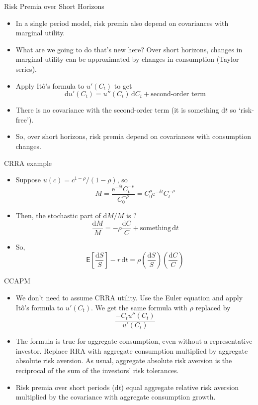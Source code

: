 \documentclass[10pt]{beamer}
\newcommand{\bi}{\begin{itemize}}
\newcommand{\ei}{\end{itemize}}
\newcommand{\im}{\item}
\newcommand{\D}{\mathrm{d}}
\newcommand{\E}{\mathrm{e}}
\newcommand{\mye}{\ensuremath{\mathsf{E}}}
\begin{document}
\begin{frame}{Risk Premia over Short Horizons}
  \bi
    \im In a single period model, risk premia also depend on covariances with marginal utility.
    
    \im What are we going to do that's new here?  Over short horizons, changes in marginal utility can be approximated by changes in consumption (Taylor series).
    
    \im Apply It\^o's formula to $u'(C_t)$ to get
    $$\D u'(C_t) = u''(C_t)\,\D C_t + \text{second-order term}$$
    \im There is no covariance with the second-order term (it is something $\D t$ so `risk-free').  
    
    \im So, over short horizons, risk premia depend on covariances with consumption changes.
    \ei
\end{frame}

\begin{frame}{CRRA example}
  \bi 
  \im Suppose $u(c) = c^{1-\rho}/(1-\rho)$, so
  $$M=\frac{\E^{-\delta t}C_t^{-\rho}}{C_0^{-\rho}} =C_0^\rho\E^{-\delta t}C_t^{-\rho}$$
  \im Then, the stochastic part of $\D M/M$ is ?
  \pause 
  $$\frac{\D M}{M} = -\rho \frac{\D C}{C} + \text{something}\,\D t$$
  \pause
  \im So,
  $$\mye\left[\frac{\D S}{S}\right] -r\,\D t= \rho \left(\frac{\D S}{S}\right)\left(\frac{\D C}{C}\right)$$
  \ei
\end{frame}

\begin{frame}{CCAPM}
  \bi 
\im We don't need to assume CRRA utility.  Use the Euler equation and apply It\^o's formula to $u'(C_t)$.  We get the same formula with $\rho$ replaced by
$$\frac{-C_tu''(C_t)}{u'(C_t)}$$

\im The formula is true for aggregate consumption, even without a representative investor.  Replace RRA with aggregate consumption multiplied by aggregate absolute risk aversion. As usual, aggregate absolute risk aversion is the reciprocal of the sum of the investors' risk tolerances.

\im Risk premia over short periods ($\D t$) equal aggregate relative risk aversion multiplied by the covariance with aggregate consumption growth.
\ei
\end{frame}
\end{document}

